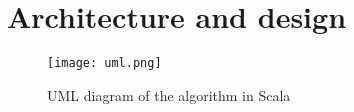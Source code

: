 \section{Architecture and design}
\label{sec:Design}

\begin{figure}[!h]
\centering
\texttt{[image: uml.png]}
\caption{UML diagram of the algorithm in Scala}
\label{fig:uml}
\end{figure}
